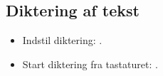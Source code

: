 \documentclass[a4paper, landscape, 10pt]{scrartcl}
\begin{document}
\begin{multicols}{2}
\subsection*{Diktering af tekst}
\begin{itemize}
  \item {Indstil diktering: .}
  \item {Start diktering fra tastaturet: \faMicrophone.}
\end{itemize}

\end{multicols}
\hrulefill{}
\end{document}
